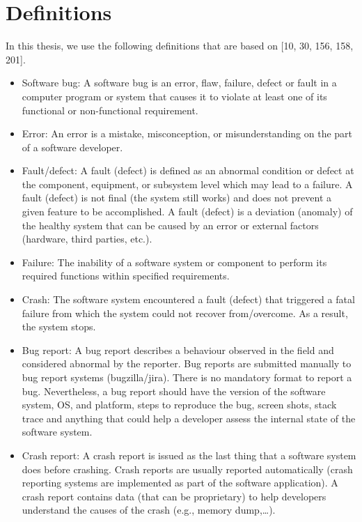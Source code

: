 \documentclass[12pt]{report}
\providecommand{\tightlist}{%
  \setlength{\itemsep}{0pt}\setlength{\parskip}{0pt}}
\begin{document}
\section{\texorpdfstring{Definitions\label{sec:version-control}}{Definitions}}\label{definitions}

In this thesis, we use the following definitions that are based on
{[}10, 30, 156, 158, 201{]}.

\begin{itemize}
\tightlist
\item
  Software bug: A software bug is an error, flaw, failure, defect or
  fault in a computer program or system that causes it to violate at
  least one of its functional or non-functional requirement.
\item
  Error: An error is a mistake, misconception, or misunderstanding on
  the part of a software developer.
\item
  Fault/defect: A fault (defect) is defined as an abnormal condition or
  defect at the component, equipment, or subsystem level which may lead
  to a failure. A fault (defect) is not final (the system still works)
  and does not prevent a given feature to be accomplished. A fault
  (defect) is a deviation (anomaly) of the healthy system that can be
  caused by an error or external factors (hardware, third parties,
  etc.).
\item
  Failure: The inability of a software system or component to perform
  its required functions within specified requirements.
\item
  Crash: The software system encountered a fault (defect) that triggered
  a fatal failure from which the system could not recover from/overcome.
  As a result, the system stops.
\item
  Bug report: A bug report describes a behaviour observed in the field
  and considered abnormal by the reporter. Bug reports are submitted
  manually to bug report systems (bugzilla/jira). There is no mandatory
  format to report a bug. Nevertheless, a bug report should have the
  version of the software system, OS, and platform, steps to reproduce
  the bug, screen shots, stack trace and anything that could help a
  developer assess the internal state of the software system.
\item
  Crash report: A crash report is issued as the last thing that a
  software system does before crashing. Crash reports are usually
  reported automatically (crash reporting systems are implemented as
  part of the software application). A crash report contains data (that can be
  proprietary) to help developers understand the causes of the crash
  (e.g., memory dump,\ldots{}).
\end{itemize}
\end{document}

